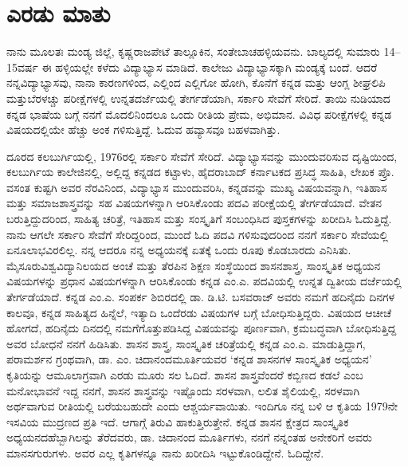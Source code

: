 
\chapter{ಎರಡು ಮಾತು}

ನಾನು ಮೂಲತಃ ಮಂಡ್ಯ ಜಿಲ್ಲೆ, ಕೃಷ್ಣರಾಜಪೇಟೆ ತಾಲ್ಲೂಕಿನ, ಸಂತೇಬಾಚಹಳ್ಳಿಯವನು. ಬಾಲ್ಯದಲ್ಲಿ ಸುಮಾರು 14–15\break ವರ್ಷ ಈ ಹಳ್ಳಿಯಲ್ಲೇ ಕಳೆದು ವಿದ್ಯಾಭ್ಯಾಸ ಮಾಡಿದೆ. ಕಾಲೇಜು ವಿದ್ಯಾಭ್ಯಾಸಕ್ಕಾಗಿ ಮಂಡ್ಯಕ್ಕೆ ಬಂದೆ. ಆದರೆ ನನ್ನ\break ವಿದ್ಯಾಭ್ಯಾಸವು, ನಾನಾ ಕಾರಣಗಳಿಂದ, ಎಲ್ಲಿಂದ ಎಲ್ಲಿಗೋ ಹೋಗಿ, ಕೊನೆಗೆ ಕನ್ನಡ ಮತ್ತು ಆಂಗ್ಲ ಶೀಘ್ರಲಿಪಿ ಮತ್ತು\break ಬೆರಳಚ್ಚು ಪರೀಕ್ಷೆಗಳಲ್ಲಿ ಉನ್ನತದರ್ಜೆಯಲ್ಲಿ ತೇರ್ಗಡೆಯಾಗಿ, ಸರ್ಕಾರಿ ಸೇವೆಗೆ ಸೇರಿದೆ. ತಾಯಿ ನುಡಿಯಾದ ಕನ್ನಡ ಭಾಷೆಯ ಬಗ್ಗೆ ನನಗೆ ಮೊದಲಿನಿಂದಲೂ ಒಂದು ರೀತಿಯ ಪ್ರೇಮ, ಅಭಿಮಾನ. ವಿವಿಧ ಪರೀಕ್ಷೆಗಳಲ್ಲಿ ಕನ್ನಡ ವಿಷಯದಲ್ಲಿಯೇ ಹೆಚ್ಚು ಅಂಕ ಗಳಿಸುತ್ತಿದ್ದೆ. ಓದುವ ಹವ್ಯಾಸವೂ ಬಹಳವಾಗಿತ್ತು. 

ದೂರದ ಕಲಬುರ್ಗಿಯಲ್ಲಿ, 1976ರಲ್ಲಿ ಸರ್ಕಾರಿ ಸೇವೆಗೆ ಸೇರಿದೆ. ವಿದ್ಯಾಭ್ಯಾಸವನ್ನು ಮುಂದುವರಿಸುವ ದೃಷ್ಟಿಯಿಂದ, ಕಲಬುರ್ಗಿಯ ಕಾಲೇಜಿನಲ್ಲಿ, ಅಲ್ಲಿದ್ದ ಕನ್ನಡದ ಕಟ್ಟಾಳು, ಹೈದರಾಬಾದ್​ ಕರ್ನಾಟಕದ ಪ್ರಸಿದ್ಧ ಸಾಹಿತಿ, ಲೇಖಕ ಪ್ರೊ. ವಸಂತ ಕುಷ್ಟಗಿ ಅವರ ನೆರವಿನಿಂದ, ವಿದ್ಯಾಭ್ಯಾಸ ಮುಂದುವರಿಸಿ, ಕನ್ನಡವನ್ನು ಮುಖ್ಯ ವಿಷಯವನ್ನಾಗಿ, ಇತಿಹಾಸ ಮತ್ತು ಸಮಾಜಶಾಸ್ತ್ರವನ್ನು ಸಹ ವಿಷಯಗಳನ್ನಾಗಿ ಆರಿಸಿಕೊಂಡು ಪದವಿ ಪರೀಕ್ಷೆಯಲ್ಲಿ ತೇರ್ಗಡೆಯಾದೆ. ವೇತನ ಬರುತ್ತಿದ್ದುದರಿಂದ, ಸಾಹಿತ್ಯ ಚರಿತ್ರೆ, ಇತಿಹಾಸ ಮತ್ತು ಸಂಸ್ಕೃತಿಗೆ ಸಂಬಂಧಿಸಿದ ಪುಸ್ತಕಗಳನ್ನು ಖರೀದಿಸಿ ಓದುತ್ತಿದ್ದೆ. ನಾನು ಆಗಲೇ ಸರ್ಕಾರಿ ಸೇವೆಗೆ ಸೇರಿದ್ದರಿಂದ, ಮುಂದೆ ಓದಿ ಪದವಿ ಗಳಿಸುವುದರಿಂದ ನನಗೆ ಸರ್ಕಾರಿ ಸೇವೆಯಲ್ಲಿ ಏನೂ\break ಲಾಭವಿರಲಿಲ್ಲ. ನನ್ನ ಆದರೂ ನನ್ನ ಅಧ್ಯಯನಕ್ಕೆ ಏತಕ್ಕೆ ಒಂದು ರೂಪು ಕೊಡಬಾರದು ಎನಿಸಿತು. ಮೈಸೂರು\break ವಿಶ್ವವಿದ್ಯಾನಿಲಯದ ಅಂಚೆ ಮತ್ತು ತೆರಪಿನ ಶಿಕ್ಷಣ ಸಂಸ್ಥೆಯಿಂದ ಶಾಸನಶಾಸ್ತ್ರ, ಸಾಂಸ್ಕೃತಿಕ ಅಧ್ಯಯನ ವಿಷಯಗಳನ್ನು ಪ್ರಧಾನ ವಿಷಯಗಳನ್ನಾಗಿ ಆರಿಸಿಕೊಂಡು ಕನ್ನಡ ಎಂ.ಎ. ಪದವಿಯಲ್ಲಿ ಉನ್ನತ ದ್ವಿತೀಯ ದರ್ಜೆಯಲ್ಲಿ ತೇರ್ಗಡೆಯಾದೆ. ಕನ್ನಡ ಎಂ.ಎ. ಸಂಪರ್ಕ ಶಿಬಿರದಲ್ಲಿ ಡಾ. ಡಿ.ಟಿ. ಬಸವರಾಜ್​ ಅವರು ನಮಗೆ ಹದಿನೈದು ದಿನಗಳ ಕಾಲವೂ, ಕನ್ನಡ ಸಾಹಿತ್ಯದ ಹಿನ್ನೆಲೆ, ಇತ್ಯಾದಿ ಒಂದೆರಡು ವಿಷಯಗಳ ಬಗ್ಗೆ ಬೋಧಿಸುತ್ತಿದ್ದರು. ವಿಷಯದ ಆಚೀಚೆ ಹೋಗದೆ, ಹದಿನೈದು ದಿನದಲ್ಲಿ ನಮಗೆ\break ಗೊತ್ತುಪಡಿಸಿದ್ದ ವಿಷಯವನ್ನು ಪೂರ್ಣವಾಗಿ, ಕ್ರಮಬದ್ಧವಾಗಿ ಬೋಧಿಸುತ್ತಿದ್ದ ಅವರ ಬೋಧನೆ ನನಗೆ ಹಿಡಿಸಿತು. ಶಾಸನ ಶಾಸ್ತ್ರ, ಸಾಂಸ್ಕೃತಿಕ ಚರಿತ್ರೆಯಲ್ಲಿ ಕನ್ನಡ ಎಂ.ಎ. ಮಾಡುತ್ತಿದ್ದಾಗ, ಪರಾಮರ್ಶನ ಗ್ರಂಥವಾಗಿ, ಡಾ. ಎಂ. ಚಿದಾನಂದಮೂರ್ತಿಯವರ ‘ಕನ್ನಡ ಶಾಸನಗಳ ಸಾಂಸ್ಕೃತಿಕ ಅಧ್ಯಯನ’ ಕೃತಿಯನ್ನು ಆಮೂಲಾಗ್ರವಾಗಿ ಎರಡು ಮೂರು ಸಲ ಓದಿದೆ. ಶಾಸನ ಶಾಸ್ತ್ರ\-ವೆಂದರೆ ಕಬ್ಬಿಣದ ಕಡಲೆ ಎಂಬ ಮನೋಭಾವನೆ ಇದ್ದ ನನಗೆ, ಶಾಸನ ಶಾಸ್ತ್ರವನ್ನು ಇಷ್ಟೊಂದು ಸರಳ\-ವಾಗಿ, ಲಲಿತ ಶೈಲಿಯಲ್ಲಿ, ಸರಳವಾಗಿ ಅರ್ಥವಾಗುವ ರೀತಿಯಲ್ಲಿ ಬರೆಯಬಹುದೇ ಎಂದು ಆಶ್ಚರ್ಯವಾಯಿತು. ಇಂದಿಗೂ ನನ್ನ ಬಳಿ ಆ ಕೃತಿಯ 1979ನೇ ಇಸವಿಯ ಮುದ್ರಣದ ಪ್ರತಿ ಇದೆ. ಆಗಾಗ್ಗೆ ತಿರುವಿ ಹಾಕುತ್ತಿರುತ್ತೇನೆ. ಕನ್ನಡ ಶಾಸನ ಕ್ಷೇತ್ರದ ಸಾಂಸ್ಕೃತಿಕ ಅಧ್ಯಯನದ\break ಹೆಬ್ಬಾಗಿಲನ್ನು ತೆರೆದವರು, ಡಾ. ಚಿದಾನಂದ ಮೂರ್ತಿಗಳು, ನನಗೆ ನನ್ನಂತಹ ಅನೇಕರಿಗೆ ಅವರು ಮಾನಸಗುರುಗಳು. ಅವರ ಎಲ್ಲ ಕೃತಿಗಳನ್ನೂ ನಾನು ಖರೀದಿಸಿ ಇಟ್ಟುಕೊಂಡಿದ್ದೇನೆ. ಓದಿದ್ದೇನೆ.

